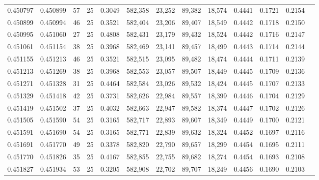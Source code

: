 \begin{tabular}{rrrrrrrrrrrrr}
0.450797 & 0.450899 &    57 &  25 &                                     0.3049 & 582,358 &  23,252 &  89,382 &  18,574 & 0.4441 & 0.1721 & 0.2154 \\
0.450899 & 0.450994 &    46 &  25 &                                     0.3521 & 582,404 &  23,206 &  89,407 &  18,549 & 0.4442 & 0.1718 & 0.2150 \\
0.450995 & 0.451060 &    27 &  25 &                                     0.4808 & 582,431 &  23,179 &  89,432 &  18,524 & 0.4442 & 0.1716 & 0.2147 \\
0.451061 & 0.451154 &    38 &  25 &                                     0.3968 & 582,469 &  23,141 &  89,457 &  18,499 & 0.4443 & 0.1714 & 0.2144 \\
0.451155 & 0.451213 &    46 &  25 &                                     0.3521 & 582,515 &  23,095 &  89,482 &  18,474 & 0.4444 & 0.1711 & 0.2139 \\
0.451213 & 0.451269 &    38 &  25 &                                     0.3968 & 582,553 &  23,057 &  89,507 &  18,449 & 0.4445 & 0.1709 & 0.2136 \\
0.451271 & 0.451328 &    31 &  25 &                                     0.4464 & 582,584 &  23,026 &  89,532 &  18,424 & 0.4445 & 0.1707 & 0.2133 \\
0.451329 & 0.451418 &    42 &  25 &                                     0.3731 & 582,626 &  22,984 &  89,557 &  18,399 & 0.4446 & 0.1704 & 0.2129 \\
0.451419 & 0.451502 &    37 &  25 &                                     0.4032 & 582,663 &  22,947 &  89,582 &  18,374 & 0.4447 & 0.1702 & 0.2126 \\
0.451505 & 0.451590 &    54 &  25 &                                     0.3165 & 582,717 &  22,893 &  89,607 &  18,349 & 0.4449 & 0.1700 & 0.2121 \\
0.451591 & 0.451690 &    54 &  25 &                                     0.3165 & 582,771 &  22,839 &  89,632 &  18,324 & 0.4452 & 0.1697 & 0.2116 \\
0.451691 & 0.451770 &    49 &  25 &                                     0.3378 & 582,820 &  22,790 &  89,657 &  18,299 & 0.4454 & 0.1695 & 0.2111 \\
0.451770 & 0.451826 &    35 &  25 &                                     0.4167 & 582,855 &  22,755 &  89,682 &  18,274 & 0.4454 & 0.1693 & 0.2108 \\
0.451827 & 0.451934 &    53 &  25 &                                     0.3205 & 582,908 &  22,702 &  89,707 &  18,249 & 0.4456 & 0.1690 & 0.2103 \\

\end{tabular}
